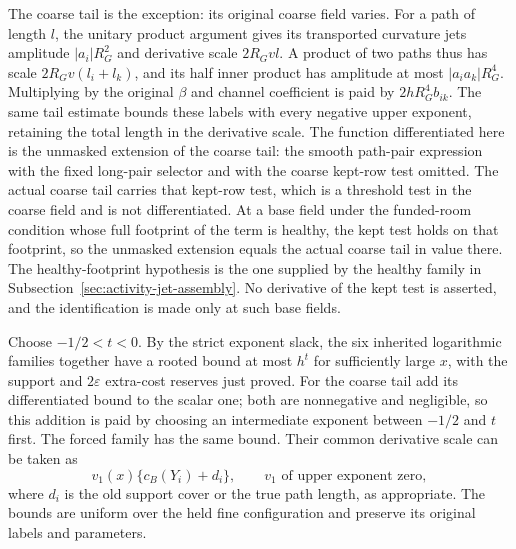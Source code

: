 The coarse tail is the exception: its original coarse field varies.
For a path of length $l$, the unitary product argument gives
its transported curvature jets amplitude $|a_i|R_G^2$ and
derivative scale $2R_Gvl$. A product of two paths thus has scale
$2R_Gv(l_i+l_k)$, and its half inner product has amplitude at
most $|a_i a_k|R_G^4$. Multiplying by the original $\beta$
and channel coefficient is paid by
$2hR_G^4 b_{ik}$. The same tail estimate bounds these labels
with every negative upper exponent, retaining the total length
in the derivative scale. The function differentiated here is the
unmasked extension of the coarse tail: the smooth path-pair expression
with the fixed long-pair selector and with the coarse kept-row test
omitted. The actual coarse tail carries that kept-row test, which is a
threshold test in the coarse field and is not differentiated. At a
base field under the funded-room condition whose full footprint of
the term is healthy, the kept test holds on that footprint, so the
unmasked extension equals the actual coarse tail in value there. The
healthy-footprint hypothesis is the one supplied by the healthy family
in Subsection~\ref{sec:activity-jet-assembly}. No derivative of the kept
test is asserted, and the identification is made only at such base
fields.

Choose $-1/2<t<0$. By the strict exponent slack, the six
inherited logarithmic families together have a rooted bound
at most $h^t$ for sufficiently large $x$, with the support and
$2\varepsilon$ extra-cost reserves just proved. For the coarse
tail add its differentiated bound to the scalar one; both are
nonnegative and negligible, so this addition is paid by choosing
an intermediate exponent between $-1/2$ and $t$ first.
The forced family has the same bound. Their common derivative
scale can be taken as
\begin{equation}\label{eq:inherited-jet-price}
 v_1(x)\{c_B(Y_i)+d_i\},\qquad
 v_1\text{ of upper exponent zero},
\end{equation}
where $d_i$ is the old support cover or the true path length,
as appropriate. The bounds are uniform over the held fine
configuration and preserve its original labels and parameters.
